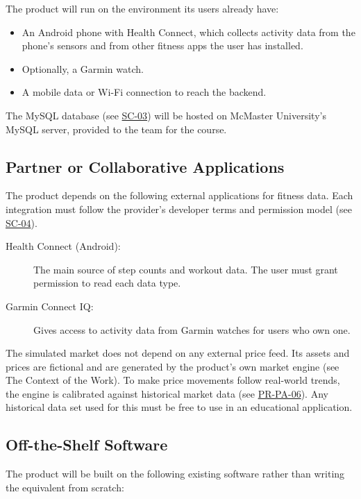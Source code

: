 \documentclass[12pt]{article}
\begin{document}
The product will run on the environment its users already have:

\begin{itemize}
  \item An Android phone with Health Connect, which collects activity data from
  the phone's sensors and from other fitness apps the user has installed.
  \item Optionally, a Garmin watch.
  \item A mobile data or Wi-Fi connection to reach the \progname{} backend.
\end{itemize}

The MySQL database (see \hyperlink{req:SC-03}{SC-03}) will be hosted on McMaster University's MySQL
server, provided to the team for the course.

\subsection{Partner or Collaborative Applications}

The product depends on the following external applications for fitness data.
Each integration must follow the provider's developer terms and permission
model (see \hyperlink{req:SC-04}{SC-04}).

\begin{description}
  \item[Health Connect (Android):] The main source of step counts and workout
  data. The user must grant \progname{} permission to read each data type.
  \item[Garmin Connect IQ:] Gives access to activity data from Garmin watches
  for users who own one.
\end{description}

The simulated market does not depend on any external price feed. Its assets and
prices are fictional and are generated by the product's own market engine (see
The Context of the Work). To make price movements follow real-world trends, the
engine is calibrated against historical market data (see \hyperlink{req:PR-PA-06}{PR-PA-06}). Any
historical data set used for this must be free to use in an educational
application.

\subsection{Off-the-Shelf Software}

The product will be built on the following existing software rather than
writing the equivalent from scratch:
\end{document}
